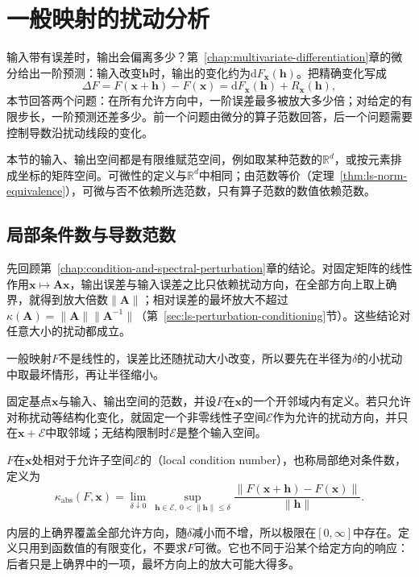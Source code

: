 \section{一般映射的扰动分析}
\label{sec:multivariable-differential-perturbation}

输入带有误差时，输出会偏离多少？第~\ref{chap:multivariate-differentiation}章的微分给出一阶预测：输入改变$\bm h$时，输出的变化约为$\mathrm dF_{\bm x}(\bm h)$。把精确变化写成
\[
 \Delta F=F(\bm x+\bm h)-F(\bm x)=\mathrm dF_{\bm x}(\bm h)+R_{\bm x}(\bm h),
\]
本节回答两个问题：在所有允许方向中，一阶误差最多被放大多少倍；对给定的有限步长，一阶预测还差多少。前一个问题由微分的算子范数回答，后一个问题需要控制导数沿扰动线段的变化。

本节的输入、输出空间都是有限维赋范空间，例如取某种范数的$\mathbb R^d$，或按元素排成坐标的矩阵空间。可微性的定义与$\mathbb R^d$中相同；由范数等价（定理~\ref{thm:ls-norm-equivalence}），可微与否不依赖所选范数，只有算子范数的数值依赖范数。

\subsection{局部条件数与导数范数}
\label{sec:multivariable-local-condition-number}

先回顾第~\ref{chap:condition-and-spectral-perturbation}章的结论。对固定矩阵的线性作用$\bm x\mapsto\bm A\bm x$，输出误差与输入误差之比只依赖扰动方向，在全部方向上取上确界，就得到放大倍数$\lVert\bm A\rVert$；相对误差的最坏放大不超过$\kappa(\bm A)=\lVert\bm A\rVert\lVert\bm A^{-1}\rVert$（第~\ref{sec:ls-perturbation-conditioning}节）。这些结论对任意大小的扰动都成立。

一般映射$F$不是线性的，误差比还随扰动大小改变，所以要先在半径为$\delta$的小扰动中取最坏情形，再让半径缩小。

固定基点$\bm x$与输入、输出空间的范数，并设$F$在$\bm x$的一个开邻域内有定义。若只允许对称扰动等结构化变化，就固定一个非零线性子空间$\mathcal E$作为允许的扰动方向，并只在$\bm x+\mathcal E$中取邻域；无结构限制时$\mathcal E$是整个输入空间。
\begin{definition}[局部条件数]
\label{def:multivariable-local-condition-number}
$F$在$\bm x$处相对于允许子空间$\mathcal E$的（local condition number），也称局部绝对条件数，定义为
\begin{equation}
 \kappa_{\mathrm{abs}}(F,\bm x)=\lim_{\delta\downarrow0}\ \sup_{\bm h\in\mathcal E,\ 0<\lVert\bm h\rVert\leq\delta}\frac{\lVert F(\bm x+\bm h)-F(\bm x)\rVert}{\lVert\bm h\rVert}.
\label{eq:multivariable-local-condition-number}
\end{equation}
\end{definition}
内层的上确界覆盖全部允许方向，随$\delta$减小而不增，所以极限在$[0,\infty]$中存在。定义只用到函数值的有限变化，不要求$F$可微。它也不同于沿某个给定方向的响应：后者只是上确界中的一项，最坏方向上的放大可能大得多。

